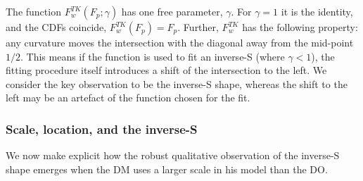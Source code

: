 \documentclass[a4paper, 12pt]{article}
\begin{document}
The function $F^{TK}_w\left(F_p; \gamma \right)$ has one free parameter, $\gamma$. For $\gamma=1$ it is the identity, and the CDFs coincide, $F^{TK}_w\left(F_p\right)=F_p$. Further, $F^{TK}_w$ has the following property: any curvature moves the intersection with the diagonal away from the mid-point $1/2$. This means if the function is used to fit an inverse-S (where $\gamma<1$), the fitting procedure itself introduces a shift of the intersection to the left. We consider the key observation to be the inverse-S shape, whereas the shift to the left may be an artefact of the function chosen for the fit.

\subsubsection{Scale, location, and the inverse-S}
We now make explicit how the robust qualitative observation of the inverse-S shape emerges when the DM uses a larger scale in his model than the DO.
\end{document}
